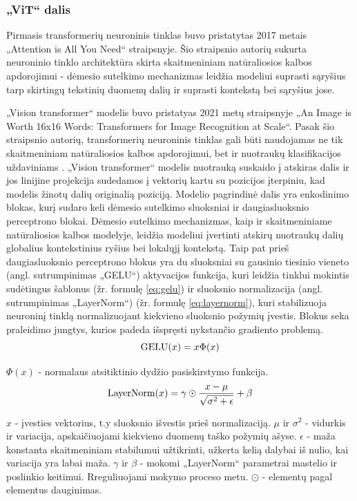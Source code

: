 \documentclass[fleqn]{VUMIFKompMagistrinis}
\begin{document}
\subsubsection{„ViT“ dalis}
\label{sec:vit}
\par
Pirmasis transformerių neuroninis tinklas buvo pristatytas 2017 metais „Attention is All You Need“ straipsnyje. Šio straipsnio autorių sukurta neuroninio tinklo architektūra skirta skaitmeniniam natūraliosios kalbos apdorojimui - dėmesio sutelkimo mechanizmas leidžia modeliui suprasti sąryšius tarp skirtingų tekstinių duomenų dalių ir suprasti kontekstą bei sąryšius jose. \cite{tranformeris}
\par
„Vision transformer“ modelis buvo pristatyas 2021 metų straipsnyje „An Image is Worth 16x16 Words: Transformers for Image Recognition at Scale“. Pasak šio straipsnio autorių, transformerių neuroninis tinklas gali būti naudojamas ne tik skaitmeniniam natūraliosios kalbos apdorojimui, bet ir nuotraukų klasifikacijos uždaviniams \cite{dosovitskiy2021image}. „Vision transformer“ modelis nuotrauką suskaido į atskiras dalis ir jos linijine projekcija sudedamos į vektorių kartu su pozicijos įterpiniu, kad modelis žinotų dalių originalią poziciją. Modelio pagrindinė dalis yra enkodinimo blokas, kurį sudaro keli dėmesio sutelkimo sluoksniai ir daugiasluoksnio perceptrono blokai. Dėmesio sutelkimo mechanizmas, kaip ir skaitmeniniame natūraliosios kalbos modelyje, leidžia modeliui įvertinti atskirų nuotraukų dalių globalius kontekstinius ryšius bei lokalųjį kontekstą. Taip pat prieš daugiasluoksnio perceptrono blokus yra du sluoksniai su gausinio tiesinio vieneto (angl. sutrumpinimas „GELU“) aktyvacijos funkcija, kuri leidžia tinklui mokintis sudėtingus šablonus (žr. formulę \ref{eq:gelu}) ir sluoksnio normalizacija (angl. sutrumpinimas „LayerNorm“) (žr. formulę \ref{eq:layernorm}), kuri stabilizuoja neuroninį tinklą normalizuojant kiekvieno sluoksnio požymių įvestis. Blokus seka praleidimo jungtys, kurios padeda išspręsti nykstančio gradiento problemą. \cite{dosovitskiy2021image}
\begin{equation}
    \centering\label{eq:gelu}
    \text{GELU}(x) = x \Phi(x)
\end{equation}
\par
\(\Phi(x)\) - normalaus atsitiktinio dydžio pasiskirstymo funkcija. 
\begin{equation}\label{eq:layernorm}
    \centering
    \text{LayerNorm}(x) = \gamma \odot \frac{x - \mu}{\sqrt{\sigma^2 + \epsilon}} + \beta
\end{equation}
\par
\( x \) - įvesties vektorius, t.y sluoksnio išvestis prieš normalizaciją.
\( \mu \) ir \( \sigma^2 \) - vidurkis ir variacija, apskaičiuojami kiekvieno duomenų taško požymių ašyse.
\( \epsilon \) - maža konstanta skaitmeniniam stabilumui užtikrinti, užkerta kelią dalybai iš nulio, kai variacija yra labai maža.
 \( \gamma \) ir \( \beta \) - mokomi „LayerNorm“ parametrai mastelio ir poslinkio keitimui. Rreguliuojami mokymo proceso metu.
\( \odot \) - elementų pagal elementus dauginimas.
\end{document}
